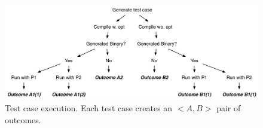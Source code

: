 \begin{figure}
  \centering %
  \includegraphics[width=\columnwidth]{img/test_process}%
  \caption{%
  	Test case execution. Each test case creates an $<A,B>$ pair of outcomes.%
  }%
  \label{fig:test-process} %
\end{figure}

